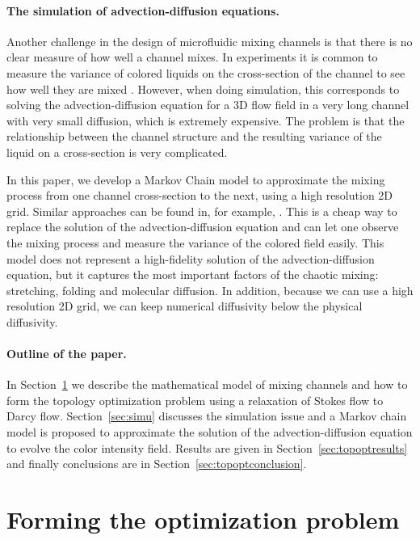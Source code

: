 \documentclass[times]{fldauth}
\begin{document}
\paragraph{The simulation of advection-diffusion equations.}
Another challenge in the design of microfluidic mixing channels is
that there is no clear measure of how well a channel mixes. In
experiments it is common to measure the variance of colored liquids on
the cross-section of the channel to see how well they are mixed
\cite{Stroock2002}. However, when doing simulation, this corresponds
to solving the advection-diffusion equation for a 3D flow field in a
very long channel with very small diffusion, which is extremely
expensive. The problem is that the relationship between the channel
structure and the resulting variance of the liquid on a cross-section
is very complicated.

In this paper, we develop a Markov Chain model to approximate the
mixing process from one channel cross-section to the next, using a
high resolution 2D grid. Similar approaches can be found in, for
example, \cite{Dellnitz1999, Dellnitz2002, Froyland1998, Froyland1999,
  Froyland2001}. This is a cheap way to replace the solution of the
advection-diffusion equation and can let one observe the mixing
process and measure the variance of the colored field easily. This
model does not represent a high-fidelity solution of the
advection-diffusion equation, but it captures the most important
factors of the chaotic mixing: stretching, folding and molecular
diffusion. In addition, because we can use a high resolution 2D grid,
we can keep numerical diffusivity below the physical diffusivity.

\paragraph{Outline of the paper.}
In Section~\ref{sec:opt} we describe the mathematical model of mixing
channels and how to form the topology optimization problem using a
relaxation of Stokes flow to Darcy flow. Section~\ref{sec:simu}
discusses the simulation issue and a Markov chain model is proposed to
approximate the solution of the advection-diffusion equation to evolve
the color intensity field. Results are given in
Section~\ref{sec:topoptresults} and finally conclusions are in
Section~\ref{sec:topoptconclusion}.

\section{Forming the optimization problem}
\label{sec:opt}
\end{document}
